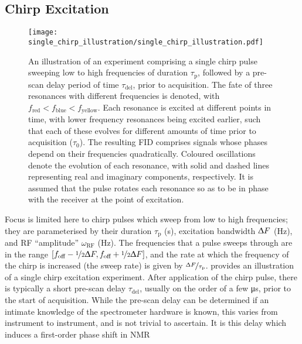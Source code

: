 \subsection{Chirp Excitation}
\begin{figure}
    \centering
    \texttt{[image: single\_chirp\_illustration/single\_chirp\_illustration.pdf]}
    \caption[
        An illustration of an experiment comprising a single chirp pulse.
    ]
    {
        An illustration of an experiment comprising a single chirp pulse sweeping
        low to high frequencies of duration $\tau_{\text{p}}$, followed by
        a pre-scan delay period of time $\tau_{\text{del}}$, prior to
        acquisition. The fate of three resonances with different frequencies is
        denoted, with $f_{\text{red}} < f_{\text{blue}} <
        f_{\text{yellow}}$. Each resonance is excited at different points
        in time, with lower frequency resonances being excited earlier, such that
        each of these evolves for different amounts of time prior
        to acquisition ($\tau_0$).
        The resulting \ac{FID} comprises signals whose phases depend on their
        frequencies quadratically.
        Coloured oscillations denote the evolution of each resonance, with
        solid and dashed lines representing real and imaginary components,
        respectively. It is assumed that the pulse rotates each
        resonance so as to be in phase with the receiver at the point of
        excitation.
    }
    \label{fig:single-chirp}
\end{figure}
Focus is limited here to chirp pulses which sweep from low to high
frequencies; they are parameterised by
their duration $\tau_{\text{p}}$ (\unit{\second}),
excitation bandwidth $\Updelta F$ (\unit{\hertz}),
and \ac{RF} ``amplitude'' $\omega_{\text{RF}}$ (\unit{\hertz}).
The frequencies that a pulse sweeps through are in the range
$[f_{\text{off}} - \nicefrac{1}{2} \Updelta F,
f_{\text{off}} + \nicefrac{1}{2} \Updelta F]$,
and the rate at which the frequency of the chirp is increased (the sweep
rate) is given by $\nicefrac{\Updelta F}{\tau_{\text{p}}}$.
 provides an illustration of a single chirp
excitation experiment. After application of the chirp pulse, there is typically
a short pre-scan delay $\tau_{\text{del}}$, usually on the order of a few
\unit{\micro\second}, prior to the start of acquisition. While the pre-scan
delay can be determined if an intimate knowledge of the spectrometer hardware
is known, this varies from instrument to instrument, and is not trivial to
ascertain. It is this delay which induces a first-order phase shift in \ac{NMR}

